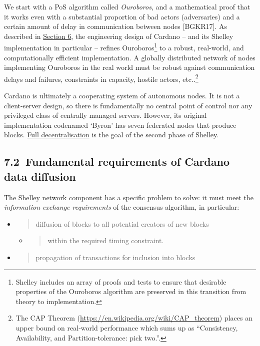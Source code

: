 \documentclass[]{article}
\begin{document}
We start with a PoS algorithm called \emph{Ouroboros}, and a
mathematical proof that it works even with a substantial proportion of
bad actors (adversaries) and a certain amount of delay in communication
between nodes {[}BGKR17{]}. As described in
\protect\hyperlink{overview}{{Section 6}}, the engineering design of
Cardano -- and its Shelley implementation in particular -- refines
Ouroboros\footnote{Shelley includes an array of proofs and tests to
  ensure that desirable properties of the Ouroboros algorithm are
  preserved in this transition from theory to implementation.} to a
robust, real-world, and computationally efficient implementation. A
globally distributed network of nodes implementing Ouroboros in the real
world must be robust against communication delays and failures,
constraints in capacity, hostile actors, etc..\footnote{The CAP Theorem
  (\href{https://en.wikipedia.org/wiki/CAP_theorem}{{https://en.wikipedia.org/wiki/CAP\_theorem}})
  places an upper bound on real-world performance which sums up as
  ``Consistency, Availability, and Partition-tolerance: pick two.''.}

Cardano is ultimately a cooperating system of autonomous nodes. It is
not a client-server design, so there is fundamentally no central point
of control nor any privileged class of centrally managed servers.
However, its original implementation codenamed `Byron' has seven
federated nodes that produce blocks.
\protect\hyperlink{decentralisation-design}{{Full decentralisation}} is
the goal of the second phase of Shelley.

\hypertarget{fundamental-requirements-of-cardano-data-diffusion}{%
\subsection{​7.2​~Fundamental requirements of Cardano data
diffusion}\label{fundamental-requirements-of-cardano-data-diffusion}}

The Shelley network component has a specific problem to solve: it must
meet the \emph{information exchange requirements} of the consensus
algorithm, in particular:

\begin{itemize}
\item
  \begin{quote}
  diffusion of blocks to all potential creators of new blocks
  \end{quote}

  \begin{itemize}
  \item
    \begin{quote}
    within the required timing constraint.
    \end{quote}
  \end{itemize}
\item
  \begin{quote}
  propagation of transactions for inclusion into blocks
  \end{quote}
\end{itemize}
\end{document}
